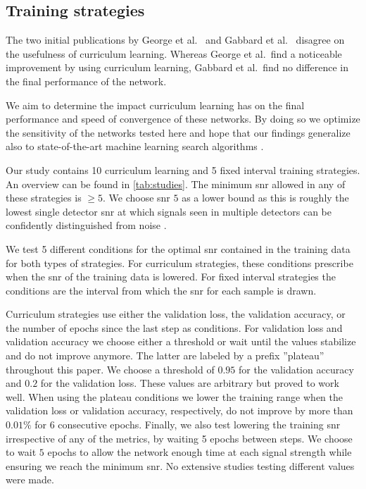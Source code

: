 \subsection{Training strategies}\label{sec:methods:training_strategies}
The two initial publications by George et al.\ \cite{George:2016hay} and Gabbard et al.\ \cite{Gabbard:2017lja} disagree on the usefulness of curriculum learning. Whereas George et al.\ find a noticeable improvement by using curriculum learning, Gabbard et al.\ find no difference in the final performance of the network.

We aim to determine the impact curriculum learning has on the final performance and speed of convergence of these networks. By doing so we optimize the sensitivity of the networks tested here and hope that our findings generalize also to state-of-the-art machine learning search algorithms \cite{Krastev:2019koe, Schafer:2020kor, Gabbard:2019rde, Wei:2020ztw}.

Our study contains 10 curriculum learning and 5 fixed interval training strategies. An overview can be found in \autoref{tab:studies}. The minimum \acrshort{snr} allowed in any of these strategies is $\geq 5$. We choose \acrshort{snr} $5$ as a lower bound as this is roughly the lowest single detector \acrshort{snr} at which signals seen in multiple detectors can be confidently distinguished from noise \cite{LIGOScientific:2020ibl,Nitz:2021uxj}.

We test 5 different conditions for the optimal \acrshort{snr} contained in the training data for both types of strategies. For curriculum strategies, these conditions prescribe when the \acrshort{snr} of the training data is lowered. For fixed interval strategies the conditions are the interval from which the \acrshort{snr} for each sample is drawn.

Curriculum strategies use either the validation loss, the validation accuracy, or the number of epochs since the last step as conditions. For validation loss and validation accuracy we choose either a threshold or wait until the values stabilize and do not improve anymore. The latter are labeled by a prefix ''plateau'' throughout this paper. We choose a threshold of $0.95$ for the validation accuracy and $0.2$ for the validation loss. These values are arbitrary but proved to work well. When using the plateau conditions we lower the training range when the validation loss or validation accuracy, respectively, do not improve by more than $0.01\%$ for $6$ consecutive epochs. Finally, we also test lowering the training \acrshort{snr} irrespective of any of the metrics, by waiting 5 epochs between steps. We choose to wait $5$ epochs to allow the network enough time at each signal strength while ensuring we reach the minimum \acrshort{snr}. No extensive studies testing different values were made.

